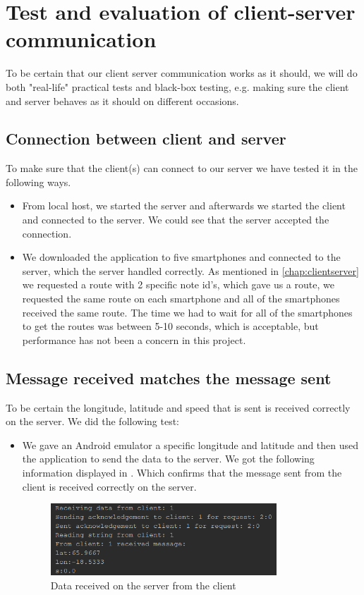 \section{Test and evaluation of client-server communication}
To be certain that our client server communication works as it should, we will do both "real-life" practical tests and black-box testing, e.g. making sure the client and server behaves as it should on different occasions.

\subsection{Connection between client and server}
To make sure that the client(s) can connect to our server we have tested it in the following ways.
\begin{itemize}
	\item From local host, we started the server and afterwards we started the client and connected to the server. We could see that the server accepted the connection.
	\item We downloaded the application to five smartphones and connected to the server, which the server handled correctly. As mentioned in \autoref{chap:clientserver} we requested a route with 2 specific note id's, which gave us a route, we requested the same route on each smartphone and all of the smartphones received the same route. The time we had to wait for all of the smartphones to get the routes was between 5-10 seconds, which is acceptable, but performance has not been a concern in this project.
\end{itemize}

\subsection{Message received matches the message sent}
To be certain the longitude, latitude and speed that is sent is received correctly on the server. We did the following test:
\begin{itemize}
	\item We gave an Android emulator a specific longitude and latitude and then used the application to send the data to the server. We got the following information displayed in . Which confirms that the message sent from the client is received correctly on the server.
	\begin{figure}[h!]
  \centering
    \includegraphics[width=0.8\textwidth]{figures/datasentfromclienttoserver.png}
    \caption{Data received on the server from the client}
    \label{fig:datasentfromclienttoserver}
\end{figure}
\end{itemize}

